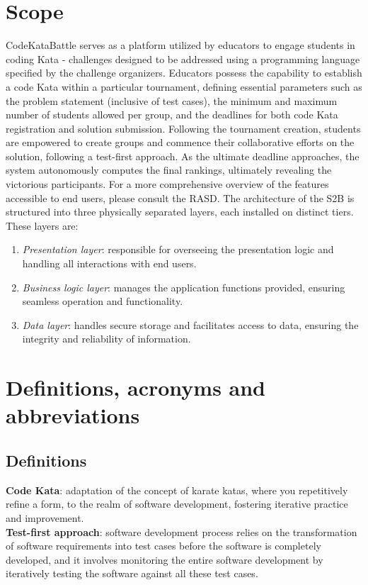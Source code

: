 \documentclass[12pt, a4paper]{report}
\begin{document}
    \section{Scope}
    CodeKataBattle serves as a platform utilized by educators to engage students in coding Kata - challenges designed to be addressed using a programming language specified by the challenge organizers. 
    Educators possess the capability to establish a code Kata within a particular tournament, defining essential parameters such as the problem statement (inclusive of test cases), 
    the minimum and maximum number of students allowed per group, and the deadlines for both code Kata registration and solution submission.
    Following the tournament creation, students are empowered to create groups and commence their collaborative efforts on the solution, following a test-first approach. 
    As the ultimate deadline approaches, the system autonomously computes the final rankings, ultimately revealing the victorious participants.
    For a more comprehensive overview of the features accessible to end users, please consult the RASD. 
    The architecture of the S2B is structured into three physically separated layers, each installed on distinct tiers. 
    These layers are:
    \begin{enumerate}
        \item \textit{Presentation layer}: responsible for overseeing the presentation logic and handling all interactions with end users.
        \item \textit{Business logic layer}: manages the application functions provided, ensuring seamless operation and functionality.
        \item \textit{Data layer}: handles secure storage and facilitates access to data, ensuring the integrity and reliability of information.
    \end{enumerate}

    \section{Definitions, acronyms and abbreviations}
    \subsection{Definitions}
    \textbf{Code Kata}: adaptation of the concept of karate katas, where you repetitively refine a form, to the realm of software development, fostering iterative practice and improvement. \\
    \textbf{Test-first approach}:  software development process relies on the transformation of software requirements into test cases before the software is completely developed, and it involves monitoring the entire software development by iteratively testing the software against all these test cases.
    
\end{document}
